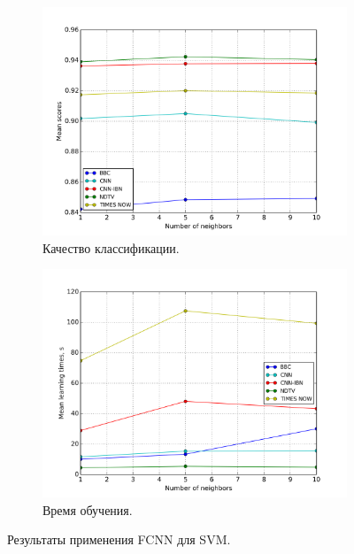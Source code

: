 \begin{figure}[h!]
	\centering
	\begin{subfigure}{0.45\textwidth}
		\includegraphics[width=\textwidth]{images/fcnn-SVM.png}
		\caption{Качество классификации.}
	\end{subfigure}
	\begin{subfigure}{0.45\textwidth}
		\includegraphics[width=\textwidth]{images/fcnn-SVMTime.png}
		\caption{Время обучения.}
	\end{subfigure}
	\caption{Результаты применения FCNN для SVM.}\label{fig:fcnn-svm-results}
\end{figure}

